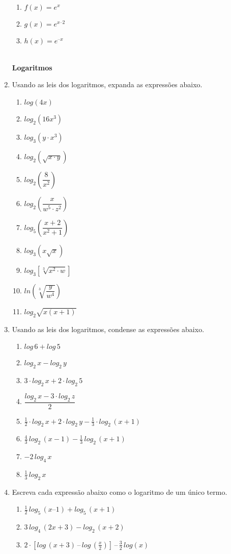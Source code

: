 \documentclass[a4paper, 11pt]{article}
\begin{document}
\begin{enumerate}
	\begin{enumerate}
\item $f(x) = e^x$
\item $g(x) = e^{x – 2}$
\item $h(x) = e^{–x}$
\\
\\
	\end{enumerate}

\textbf{Logaritmos}

\item Usando as leis dos logaritmos, expanda as expressões abaixo.
	\begin{enumerate}
\item $log(4x)$ 
\item $log_2(16x^3)$ 
\item $log_3(y \cdot x^3)$ 
\item $log_2 (\sqrt{x \cdot y})$
\item $log_2 \left( \dfrac{8}{x^2} \right)$
\item $log_2(\dfrac{x}{ w^5 \cdot z^2})$
\item $log_5 \left( \dfrac{x+2}{x^2+1} \right)$
\item $log_3 \left( x\sqrt{x} \right)$
\item $log_3 [\sqrt[3]{x^2 \cdot w}]$
\item $ln \left( \sqrt[3]{ \dfrac{y}{w^4} } \right)$
\item $log_2 \sqrt{x(x+1)}$
	\end{enumerate}

\item Usando as leis dos logaritmos, condense as expressões abaixo.
	\begin{enumerate}
\item $log \, 6 + log \, 5$
\item $log_2 \, x - log_2 \, y$
\item $3 \cdot log_2 \, x + 2 \cdot log_2 \, 5$
\item $\dfrac{log_2 \, x - 3 \cdot log_2 \, z}{2}$
\item $\frac{1}{2} \cdot log_2 \, x + 2 \cdot log_2 \, y - \frac{1}{3} \cdot log_2 \, (x+1)$
\item $\frac{4}{3} \, log_2 \, (x-1) - \frac{1}{3} \, log_2 \, (x + 1)$
\item $-2 \, log_4 \, x$
\item $\frac{1}{3} \, log_2 \, x$
	\end{enumerate}

\item Escreva cada expressão abaixo como o logaritmo de um único termo.
	\begin{enumerate}
\item $\frac{1}{2} \, log_5 \, (x – 1) + log_5 \, (x + 1)$
\item $3 \, log_4 \, (2x + 3) - log_2 \, (x + 2) $
\item $2 \cdot [log  \, (x + 3) \, – \, log \, ( \frac{x}{2} )] \, – \, \frac{3}{2} \, log(x)$
	\end{enumerate}


\end{enumerate}
\end{document}
